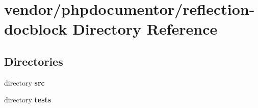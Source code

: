 \section{vendor/phpdocumentor/reflection-\/docblock Directory Reference}
\label{dir_cf4dd875c175cd40f363d23c4ddf8be3}
\subsection*{Directories}
\begin{DoxyCompactItemize}
\item 
directory {\bf src}
\item 
directory {\bf tests}
\end{DoxyCompactItemize}
